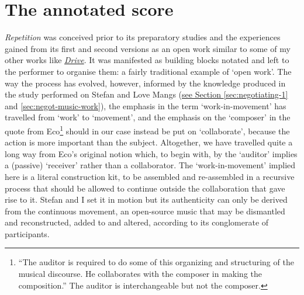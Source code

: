 


\section{The annotated score}
\label{sec:negotiating-6}

\emph{Repetition} was conceived prior to its preparatory studies and the experiences gained from its first and second versions as an open work similar to some of my other works like \hyperref[sec:drive-2003]{\emph{Drive}}. It was manifested as building blocks notated and left to the performer to organise them: a fairly traditional example of `open work'. The way the process has evolved, however, informed by the knowledge produced in the study performed on Stefan and Love Mangs (\hyperref[sec:negotiating-1]{see Section \ref*{sec:negotiating-1}} and \ref*{sec:negot-music-work}), the emphasis in the term `work-in-movement' has travelled from `work' to `movement', and the emphasis on the `composer' in the quote from Eco\footnote{``The auditor is required to do some of this organizing and structuring of the musical discourse. He collaborates with the composer in making the
composition.'' \cite{eco68} The auditor is interchangeable but not the composer.} should in our case instead be put on `collaborate', because the action is more important than the subject. Altogether, we have  travelled quite a long way from Eco's original notion which, to begin with, by the `auditor' implies a (passive) `receiver' rather than a collaborator. The `work-in-movement'  implied here is a literal construction kit, to be assembled and re-assembled in a recursive process that should be allowed to continue outside the collaboration that gave rise to it. Stefan and I set it in motion but its authenticity can only be derived from the continuous movement, an open-source music that may be dismantled and reconstructed, added to and altered, according to its conglomerate of participants.

